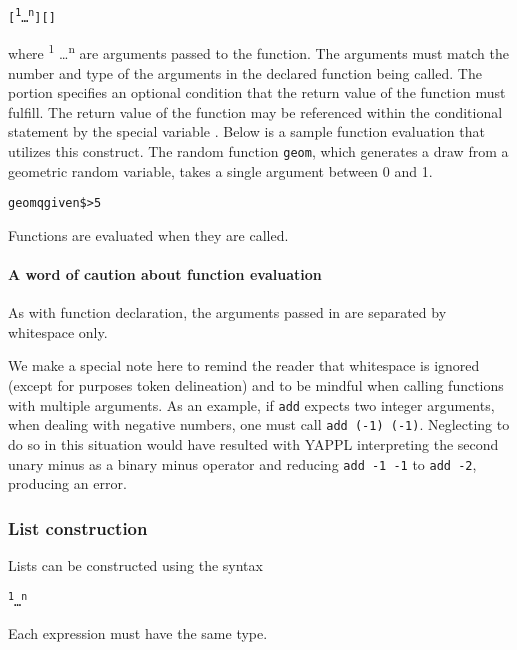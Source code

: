 \begin{alltt}
\quad \term{\midtilde}  [ \textsuperscript{1} \dots {}\textsuperscript{n} ] [   ] 
\end{alltt}

where  \textsuperscript{1} \dots {}\textsuperscript{n} are arguments passed to the function. The arguments must match the number and type of the arguments in the declared function being called. The   portion specifies an optional condition that the return value of the function must fulfill. The return value of the function may be referenced within the conditional statement by the special variable \term{\$}. Below is a sample function evaluation that utilizes this construct. The random function \texttt{geom}, which generates a draw from a geometric random variable, takes a single argument between 0 and 1.

\begin{alltt}
\quad \midtilde geom q given \$ > 5
\end{alltt}

Functions are evaluated when they are called. 

\paragraph{A word of caution about function evaluation}

As with function declaration, the arguments passed in are separated by whitespace only.

We make a special note here to remind the reader that whitespace is ignored (except for purposes token delineation) and to be mindful when calling functions with multiple arguments. As an example, if \texttt{add} expects two integer arguments, when dealing with negative numbers, one must call \texttt{\midtilde add (-1) (-1)}. Neglecting to do so in this situation would have resulted with YAPPL interpreting the second unary minus as a binary minus operator and reducing \texttt{\midtilde add -1 -1} to \texttt{\midtilde add -2}, producing an error.

\subsubsection{List construction}

Lists can be constructed using the syntax
\begin{alltt}
\quad \term{[} \textsuperscript{1} \term{,} \dots \term{,} \textsuperscript{n}  \term{]}
\end{alltt}
Each expression must have the same type. 


